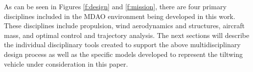 As can be seen in Figures \ref{f:design} and \ref{f:mission}, there are four primary disciplines included in the MDAO environment being developed in this work.  
These disciplines include propulsion, wind aerodynamics and structures, aircraft mass, and optimal control and trajectory analysis.
The next sections will describe the individual disciplinary tools created to support the above multidisciplinary design process as well as the specific models developed to represent the tiltwing vehicle under consideration in this paper.



